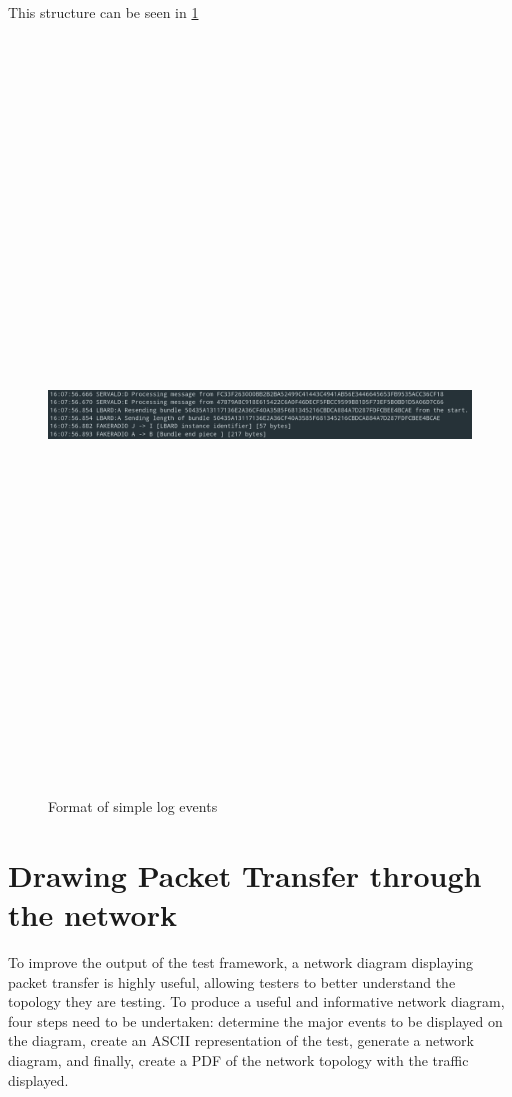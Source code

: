 This structure can be seen in \figurename{ \ref{fig:chapter5SimpleLogFormat}}
\begin{figure}
    \begin{centering}
        \includegraphics[width=15cm,height=20cm,keepaspectratio]{Figures/Chapter5-SimpleLogFormat.png}
        \caption{Format of simple log events}
        \label{fig:chapter5SimpleLogFormat}
    \end{centering}
\end{figure}





\section{Drawing Packet Transfer through the network}
To improve the output of the test framework, a network diagram displaying packet transfer is highly useful, allowing testers to better understand the topology they are testing. To produce a useful and informative network diagram, four steps need to be undertaken: determine the major events to be displayed on the diagram, create an ASCII representation of the test, generate a network diagram, and finally, create a PDF of the network topology with the traffic displayed.


